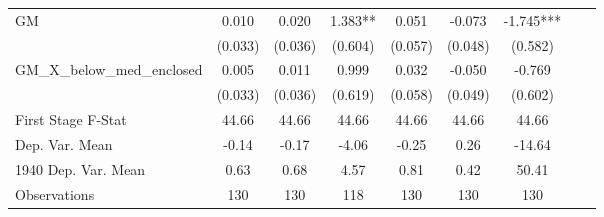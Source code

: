 \begin{tabular}{l*{8}{c}}
\cmidrule(lr){1-7}
GM              &    0.010   &    0.020   &    1.383** &    0.051   &   -0.073   &   -1.745***\\
                &  (0.033)   &  (0.036)   &  (0.604)   &  (0.057)   &  (0.048)   &  (0.582)   \\
\addlinespace
GM\_X\_below\_med\_enclosed&    0.005   &    0.011   &    0.999   &    0.032   &   -0.050   &   -0.769   \\
                &  (0.033)   &  (0.036)   &  (0.619)   &  (0.058)   &  (0.049)   &  (0.602)   \\
\midrule
First Stage F-Stat&    44.66   &    44.66   &    44.66   &    44.66   &    44.66   &    44.66   \\
Dep. Var. Mean  &    -0.14   &    -0.17   &    -4.06   &    -0.25   &     0.26   &   -14.64   \\
1940 Dep. Var. Mean&     0.63   &     0.68   &     4.57   &     0.81   &     0.42   &    50.41   \\
Observations    &      130   &      130   &      118   &      130   &      130   &      130   \\
 \bottomrule \end{tabular}
